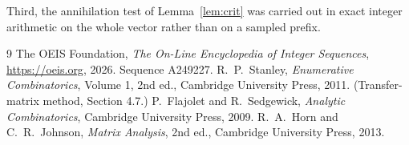 \documentclass[11pt,a4paper]{article}
\theoremstyle{plain}
\theoremstyle{definition}
\begin{document}
Third, the annihilation test of Lemma~\ref{lem:crit} was carried out in exact integer
arithmetic on the whole vector rather than on a sampled prefix.

\begin{thebibliography}{9}
 The OEIS Foundation, \emph{The On-Line Encyclopedia of Integer
Sequences}, \url{https://oeis.org}, 2026. Sequence A249227.
 R.~P.~Stanley, \emph{Enumerative Combinatorics}, Volume 1, 2nd ed.,
Cambridge University Press, 2011. (Transfer-matrix method, Section 4.7.)
 P.~Flajolet and R.~Sedgewick, \emph{Analytic Combinatorics}, Cambridge
University Press, 2009.
 R.~A.~Horn and C.~R.~Johnson, \emph{Matrix Analysis}, 2nd ed., Cambridge
University Press, 2013.
\end{thebibliography}
\end{document}
